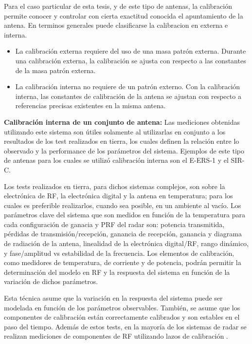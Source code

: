 Para el caso particular de esta tesis, y de este tipo de antenas, la calibración permite conocer y controlar con cierta 
exactitud conocida el apuntamiento de la antena. En terminos generales puede clasificarse la calibracion en externa e interna. 
\begin{itemize}
	\item La calibración externa requiere del uso de una masa patrón externa. Durante una calibración externa, la calibración se
		ajusta con respecto a las constantes de la masa patrón externa. 
	\item La calibración interna no requiere de un patrón externo. Con la calibración interna, las constantes de calibración de
		la antena se ajustan con respecto a referencias precisas existentes en la misma antena.
\end{itemize}

{\textbf{Calibración interna de un conjunto de antena:}} Las mediciones obtenidas utilizando este sistema son útiles solamente
al utilizarlas en conjunto a los resultados de los test realizados en tierra, los cuales definen la relación entre lo observado
y la performance de los parámetros del sistema. Ejemplos de este tipo de antenas para los cuales se utilizó calibración 
interna son el E-ERS-1 y el SIR-C.

Los tests realizados en tierra, para dichos sistemas complejos, son sobre la electrónica de RF, la electrónica digital y la
antena en temperatura; para los cuales es preferible realizarlos, cuando sea posible, en un ambiente al vacío. Los
parámetros clave del sistema que son medidos en función de la temperatura para cada configuración de ganacia y PRF del radar
son: potencia transmitida, pérdidas de transmisión/recepción, ganancia de recepción, ganancia y diagrama de radiación de la 
antena, linealidad de la electrónica digital/RF, rango dinámico, y fase/amplitud vs estabilidad de la frecuencia. Los
elementos de calibración, como medidores de temperatura, de corriente y de potencia, podrán permitir la determinación del 
modelo en RF y la respuesta del sistema en función de la variación de dichos parámetros.

Esta técnica asume que la variación en la respuesta del sistema puede ser modelada en función de los parámetros observables.
También, se asume que los componentes de calibración están correctamente calibrados y son estables en el paso del tiempo.
Además de estos tests, en la mayoría de los sistemas de radar se realizan mediciones de componentes de RF utilizando lazos de
calibración \cite{Curlander1991}.

